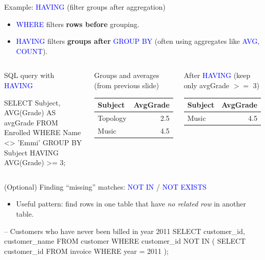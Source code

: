\documentclass[10pt,aspectratio=169]{beamer}
\newcommand{\sqlk}[1]{\textcolor{blue}{#1}}
\begin{document}
\begin{frame}[fragile]{Example: \sqlk{HAVING} (filter groups after aggregation)}
\small
\begin{itemize}
  \item \sqlk{WHERE} filters \textbf{rows before} grouping.
  \item \sqlk{HAVING} filters \textbf{groups after} \sqlk{GROUP BY} (often using aggregates like \sqlk{AVG}, \sqlk{COUNT}).
\end{itemize}

\vspace{1mm}
\begin{columns}[T,onlytextwidth]
\begin{block}{SQL query with \sqlk{HAVING}}
\begin{codesql}
SELECT Subject, AVG(Grade) AS avgGrade
FROM Enrolled
WHERE Name <> 'Emmi'
GROUP BY Subject
HAVING AVG(Grade) >= 3;
\end{codesql}
\end{block}

\begin{block}{Groups and averages (from previous slide)}
\footnotesize
\centering
\begin{tabular}{@{}lr@{}}
\toprule
\textbf{Subject} & \textbf{AvgGrade}\\
\midrule
Topology & 2.5\\
Music    & 4.5\\
\bottomrule
\end{tabular}
\end{block}

\vspace{1mm}
\begin{block}{After \sqlk{HAVING} (keep only avgGrade $>=$ 3)}
\footnotesize
\centering
\begin{tabular}{@{}lr@{}}
\toprule
\textbf{Subject} & \textbf{AvgGrade}\\
\midrule
Music & 4.5\\
\bottomrule
\end{tabular}
\end{block}

\end{columns}
\end{frame}



\begin{frame}[fragile]{(Optional) Finding ``missing'' matches: \sqlk{NOT IN} / \sqlk{NOT EXISTS}}
\begin{itemize}
  \item Useful pattern: find rows in one table that have \emph{no related row} in another table.
\end{itemize}
\vspace{0.6em}
\begin{codesql}
-- Customers who have never been billed in year 2011
SELECT customer_id, customer_name
FROM   customer
WHERE  customer_id NOT IN (
  SELECT customer_id
  FROM   invoice
  WHERE  year = 2011
);
\end{codesql}
\end{frame}
\end{document}
